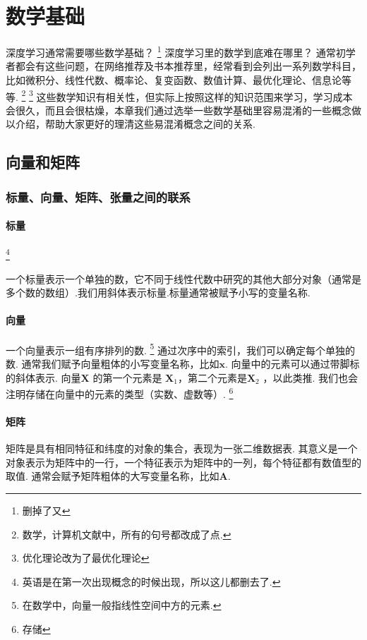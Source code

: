 \chapter{数学基础}
\label{ux7b2cux4e00ux7ae0-ux6570ux5b66ux57faux7840}
深度学习通常需要哪些数学基础？
\footnote{删掉了又}
深度学习里的数学到底难在哪里？
通常初学者都会有这些问题，在网络推荐及书本推荐里，经常看到会列出一系列数学科目，比如微积分、线性代数、概率论、复变函数、数值计算、最优化理论、信息论等等.
\footnote{数学，计算机文献中，所有的句号都改成了点.}
\footnote{优化理论改为了最优化理论}
这些数学知识有相关性，但实际上按照这样的知识范围来学习，学习成本会很久，而且会很枯燥，本章我们通过选举一些数学基础里容易混淆的一些概念做以介绍，帮助大家更好的理清这些易混淆概念之间的关系.
\section{向量和矩阵}
\label{ux5411ux91cfux548cux77e9ux9635}
\subsection{标量、向量、矩阵、张量之间的联系}
\label{ux6807ux91cfux5411ux91cfux77e9ux9635ux5f20ux91cfux4e4bux95f4ux7684ux8054ux7cfb}
\subsubsection{标量}
\footnote{英语是在第一次出现概念的时候出现，所以这儿都删去了.}
\begin{defination}
一个标量表示一个单独的数，它不同于线性代数中研究的其他大部分对象（通常是多个数的数组）.我们用斜体表示标量.标量通常被赋予小写的变量名称.  
\end{defination}
\subsubsection{向量}
\begin{defination}
  一个向量表示一组有序排列的数.
  \footnote{在数学中，向量一般指线性空间中方的元素.}
  通过次序中的索引，我们可以确定每个单独的数.
  通常我们赋予向量粗体的小写变量名称，比如$\mathbf{x}$.
  向量中的元素可以通过带脚标的斜体表示.
  向量\(\mathbf{X}\) 的第一个元素是 \(\mathbf{X}_1\)，第二个元素是\(\mathbf{X}_2\) ，以此类推.
  我们也会注明存储在向量中的元素的类型（实数、虚数等）.
  \footnote{存储}
\end{defination}
\subsubsection{矩阵}
\begin{defination}
  矩阵是具有相同特征和纬度的对象的集合，表现为一张二维数据表.
  其意义是一个对象表示为矩阵中的一行，一个特征表示为矩阵中的一列，每个特征都有数值型的取值.
  通常会赋予矩阵粗体的大写变量名称，比如\(\mathbf{A}\).  
\end{defination}
